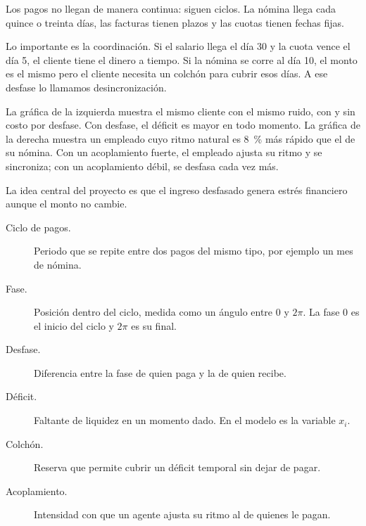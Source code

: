 \begin{decir}
Los pagos no llegan de manera continua: siguen ciclos. La nómina llega cada quince o
treinta días, las facturas tienen plazos y las cuotas tienen fechas fijas.

Lo importante es la coordinación. Si el salario llega el día 30 y la cuota vence el día
5, el cliente tiene el dinero a tiempo. Si la nómina se corre al día 10, el monto es el
mismo pero el cliente necesita un colchón para cubrir esos días. A ese desfase lo llamamos
desincronización.

La gráfica de la izquierda muestra el mismo cliente con el mismo ruido, con y sin costo
por desfase. Con desfase, el déficit es mayor en todo momento. La gráfica de la derecha
muestra un empleado cuyo ritmo natural es 8~\% más rápido que el de su nómina. Con un
acoplamiento fuerte, el empleado ajusta su ritmo y se sincroniza; con un acoplamiento
débil, se desfasa cada vez más.

La idea central del proyecto es que el ingreso desfasado genera estrés financiero aunque
el monto no cambie.
\end{decir}
\begin{terminos}
\begin{description}
\item[Ciclo de pagos.] Periodo que se repite entre dos pagos del mismo tipo, por ejemplo
un mes de nómina.
\item[Fase.] Posición dentro del ciclo, medida como un ángulo entre $0$ y $2\pi$. La
fase $0$ es el inicio del ciclo y $2\pi$ es su final.
\item[Desfase.] Diferencia entre la fase de quien paga y la de quien recibe.
\item[Déficit.] Faltante de liquidez en un momento dado. En el modelo es la variable
$x_i$.
\item[Colchón.] Reserva que permite cubrir un déficit temporal sin dejar de pagar.
\item[Acoplamiento.] Intensidad con que un agente ajusta su ritmo al de quienes le
pagan.
\end{description}
\end{terminos}

